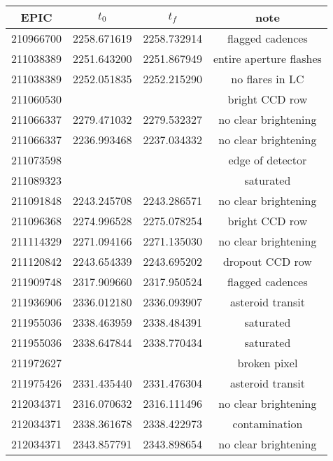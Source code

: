 \begin{tabular}{cccc}
\toprule
      EPIC &        $t_0$ &        $t_f$ &                    note \\
\midrule
 210966700 &  2258.671619 &  2258.732914 &        flagged cadences \\
 211038389 &  2251.643200 &  2251.867949 & entire aperture flashes \\
 211038389 &  2252.051835 &  2252.215290 &         no flares in LC \\
 211060530 &              &              &          bright CCD row \\
 211066337 &  2279.471032 &  2279.532327 &   no clear brightening  \\
 211066337 &  2236.993468 &  2237.034332 &   no clear brightening  \\
 211073598 &	 	  &		 &  edge of detector	   \\
 211089323 &              &              &               saturated \\
 211091848 &  2243.245708 &  2243.286571 &   no clear brightening  \\
 211096368 &  2274.996528 &  2275.078254 &          bright CCD row \\
 211114329 &  2271.094166 &  2271.135030 &   no clear brightening  \\
 211120842 &  2243.654339 &  2243.695202 &         dropout CCD row \\
 211909748 &  2317.909660 &  2317.950524 &        flagged cadences \\
 211936906 &  2336.012180 &  2336.093907 &        asteroid transit \\
 211955036 &  2338.463959 &  2338.484391 &               saturated \\
 211955036 &  2338.647844 &  2338.770434 &               saturated \\
 211972627 &              &              &            broken pixel \\
 211975426 &  2331.435440 &  2331.476304 &        asteroid transit \\
 212034371 &  2316.070632 &  2316.111496 &   no clear brightening  \\
 212034371 &  2338.361678 &  2338.422973 &           contamination \\
 212034371 &  2343.857791 &  2343.898654 &   no clear brightening  \\

\bottomrule
\end{tabular}
